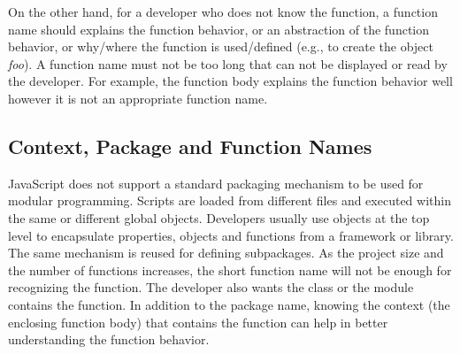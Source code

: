 \documentclass[10pt, preprint]{sigplanconf}
\begin{document}
 On the other hand, for a developer who does not know the function, a function name should explains the function behavior, or an abstraction of the function behavior, or why/where the function is used/defined (e.g., to create the object \textit{foo}). A function name must not be too long that can not be displayed or read by the developer. For example, the function body explains the function behavior well however it is not an appropriate function name.

\subsection{Context, Package and Function Names}
JavaScript does not support a standard packaging mechanism to be used for modular programming. Scripts are loaded from different files and executed within the same or different global objects. Developers usually use objects at the top level to encapsulate properties, objects and functions from a framework or library. The same mechanism is reused for defining subpackages. As the project size and the number of functions increases, the short function name will not be enough for recognizing the function. The developer also wants the class or the module contains the function. In addition to the package name, knowing the context (the enclosing function body) that contains the function can help in better understanding the function behavior.

\end{document}
